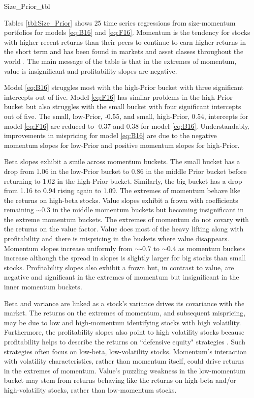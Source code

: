 
{Size_Prior_tbl}

Tables \ref{tbl:Size_Prior} shows 25 time series regressions from size-momentum
portfolios for models \ref{eq:B16} and \ref{eq:F16}.
Momentum is the tendency for stocks with higher recent returns than
their peers to continue to earn higher returns in the short term
\parencite{jegadeesh1993returns} and has been found in markets and
asset classes throughout the world \parencite{asness2013value}.
The main message of the table is that in the extremes of momentum,
value is insignificant and profitability slopes are negative.

Model \ref{eq:B16} struggles most with the high-Prior bucket with three
significant intercepts out of five.
Model \ref{eq:F16} has similar problems in the high-Prior bucket but also
struggles with the small bucket with four significant intercepts out of five.
The small, low-Prior, -0.55, and small, high-Prior, 0.54, intercepts for
model \ref{eq:F16} are reduced to -0.37 and 0.38 for model \ref{eq:B16}.
Understandably, improvements in mispricing for model \ref{eq:B16} are due to
the negative momentum slopes for low-Prior and positive momentum slopes for
high-Prior.

Beta slopes exhibit a smile across momentum buckets.
The small bucket has a drop from 1.06 in the low-Prior bucket to 0.86 in the
middle Prior bucket before returning to 1.02 in the high-Prior bucket.
Similarly, the big bucket has a drop from 1.16 to 0.94 rising again to 1.09.
The extremes of momentum behave like the returns on high-beta stocks.
Value slopes exhibit a frown with coefficients remaining $\sim$0.3 in the
middle momentum buckets but becoming insignificant in the extreme momentum
buckets.
The extremes of momentum do not covary with the returns on the value factor.
Value does most of the heavy lifting along with profitability and
there is mispricing in the buckets where value disappears.
Momentum slopes increase uniformly from $\sim$-0.7 to $\sim$0.4 as momentum
buckets increase although the spread in slopes is slightly larger for big
stocks than small stocks.
Profitability slopes also exhibit a frown but, in contrast to value, are
negative and significant in the extremes of momentum but insignificant
in the inner momentum buckets.

Beta and variance are linked as a stock's variance drives its covariance with
the market.
The returns on the extremes of momentum, and subsequent mispricing, may be due
to low and high-momentum identifying stocks with high volatility.
Furthermore, the profitability slopes also point to high volatility stocks
because profitability helps to describe the returns on ``defensive equity"
strategies \parencite{novy2014understanding}.
Such strategies often focus on low-beta, low-volatility stocks.
Momentum's interaction with volatility characteristics, rather than momentum
itself, could drive returns in the extremes of momentum.
Value's puzzling weakness in the low-momentum bucket may stem from returns
behaving like the returns on high-beta and/or high-volatility stocks,
rather than low-momentum stocks.


